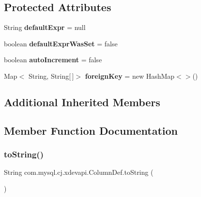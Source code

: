 \subsection*{Protected Attributes}
\begin{DoxyCompactItemize}
\item 
\mbox{\label{classcom_1_1mysql_1_1cj_1_1xdevapi_1_1_column_def_aa58ed01d138aa54f92e5466c78bdf78d}} 
String {\bfseries default\+Expr} = null
\item 
\mbox{\label{classcom_1_1mysql_1_1cj_1_1xdevapi_1_1_column_def_aa3f6564265658fab4552f1ea1ec00c5e}} 
boolean {\bfseries default\+Expr\+Was\+Set} = false
\item 
\mbox{\label{classcom_1_1mysql_1_1cj_1_1xdevapi_1_1_column_def_a849fba42478bd67641ab37fd1023aa20}} 
boolean {\bfseries auto\+Increment} = false
\item 
\mbox{\label{classcom_1_1mysql_1_1cj_1_1xdevapi_1_1_column_def_ad35e6cccdcf825ebe933d3d361aed7fa}} 
Map$<$ String, String\mbox{[}$\,$\mbox{]}$>$ {\bfseries foreign\+Key} = new Hash\+Map$<$$>$()
\end{DoxyCompactItemize}
\subsection*{Additional Inherited Members}


\subsection{Member Function Documentation}
\mbox{\label{classcom_1_1mysql_1_1cj_1_1xdevapi_1_1_column_def_ae26162c5f6538de1eec31032e130593b}} 
\subsubsection{\texorpdfstring{to\+String()}{toString()}}
{\footnotesize\ttfamily String com.\+mysql.\+cj.\+xdevapi.\+Column\+Def.\+to\+String (\begin{DoxyParamCaption}{ }\end{DoxyParamCaption})}

